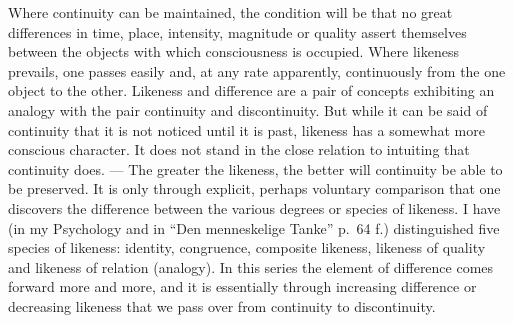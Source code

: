\documentclass[12pt]{article}
\newcommand{\opage}[1]{\marginnote{\footnotesize\textit{[#1]}}}
\begin{document}
Where continuity can be maintained, the condition will be that no great
differences in time, place, intensity, magnitude or quality assert
themselves between the objects with which consciousness is occupied. Where
likeness prevails, one passes easily and, at any rate apparently,
continuously from \opage{32}the one object to the other. Likeness and difference are a
pair of concepts exhibiting an analogy with the pair continuity and
discontinuity. But while it can be said of continuity that it is not noticed
until it is past, likeness has a somewhat more conscious character. It does
not stand in the close relation to intuiting that continuity does. --- The
greater the likeness, the better will continuity be able to be preserved. It
is only through explicit, perhaps voluntary comparison that one discovers
the difference between the various degrees or species of likeness. I have
(in my Psychology and in ``Den menneskelige Tanke'' p.~64 f.) distinguished
five species of likeness: identity, congruence, composite likeness, likeness
of quality and likeness of relation (analogy). In this series the element of
difference comes forward more and more, and it is essentially through
increasing difference or decreasing likeness that we pass over from
continuity to discontinuity.
\end{document}
